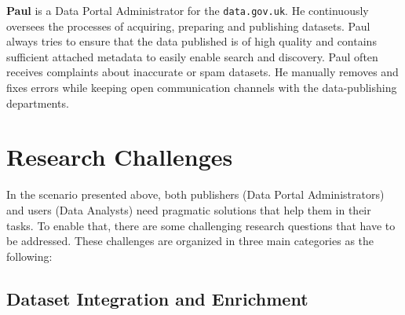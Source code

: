 \textbf{Paul} is a Data Portal Administrator for the \texttt{data.gov.uk}. He continuously oversees the processes of acquiring, preparing and publishing datasets. Paul always tries to ensure that the data published is of high quality and contains sufficient attached metadata to easily enable search and discovery. Paul often receives complaints about inaccurate or spam datasets. He manually removes and fixes errors while keeping open communication channels with the data-publishing departments.

\section{Research Challenges} \label{section:challenges}

In the scenario presented above, both publishers (Data Portal Administrators) and users (Data Analysts) need pragmatic solutions that help them in their tasks. To enable that, there are some challenging research questions that have to be addressed. These challenges are organized in three main categories as the following:

\subsection{Dataset Integration and Enrichment}


